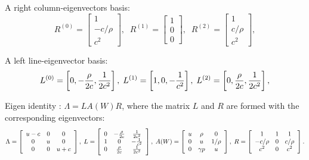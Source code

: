 \documentclass{article}
\begin{document}
A right column-eigenvectors basis:
\begin{equation}
  R^{(0)}=\left[
    \begin{array}{c}
      1\\
      -c/\rho\\
      c^2
    \end{array} \right],
  \;\;
  R^{(1)}=\left[
    \begin{array}{c}
      1\\
      0\\
      0
    \end{array} \right],
  \;\;
  R^{(2)}=\left[
    \begin{array}{c}
      1\\
      c/\rho\\
      c^2
    \end{array} \right],
\end{equation}

A left line-eigenvector basis:
\begin{equation}
  L^{(0)}=\left[0, -\frac{\rho}{2c}, \frac{1}{2c^2}\right],\;\;\\
  L^{(1)}=\left[1, 0, -\frac{1}{c^2} \right],\;\;\\
  L^{(2)}=\left[0, \frac{\rho}{2c}, \frac{1}{2c^2}\right],
\end{equation}

Eigen identity : $\Lambda = L A(W) R$, where the matrix $L$ and $R$ are formed with the corresponding eigenvectors:
\begin{equation}
  \Lambda = \left[
    \begin{array}{ccc}
      u-c& 0 & 0\\
      0  & u & 0\\
      0  & 0 & u+c
    \end{array}
  \right],\;
  L=\left[
    \begin{array}{ccc}
      0 & -\frac{\rho}{2c} & \frac{1}{2c^2}\\
      1 & 0 & -\frac{1}{c^2}\\
      0 & \frac{\rho}{2c} & \frac{1}{2c^2}
    \end{array}
  \right],\;
  A(W)=\left[
    \begin{array}{c c c c}
      u & \rho     & 0 \\
      0 & u        & 1/\rho\\
      0 & \gamma p & u \\
    \end{array}
  \right],\;
  R=\left[
    \begin{array}{ccc}
      1 & 1 & 1\\
      -c/\rho & 0 & c/\rho\\
      c^2 & 0 & c^2
    \end{array}
  \right].
\end{equation}
\end{document}
